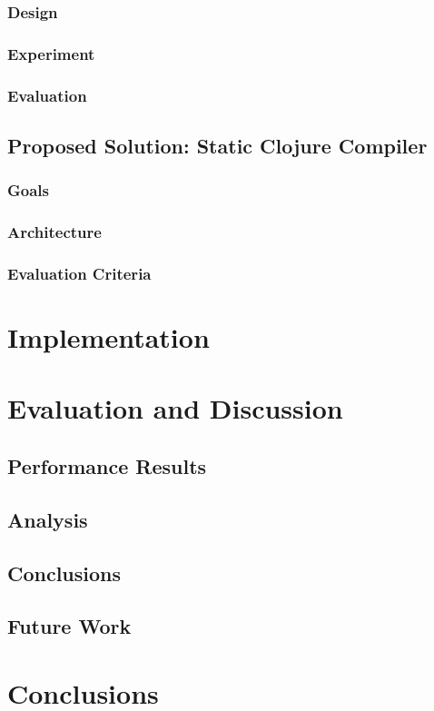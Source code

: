 \subsection{Design}
\subsection{Experiment}
\subsection{Evaluation}

\section{Proposed Solution: Static Clojure Compiler}
\subsection{Goals}
\subsection{Architecture}
\subsection{Evaluation Criteria}



\chapter{Implementation}
\label{chapter:implementation}



\chapter{Evaluation and Discussion}
\label{chapter:evaluation}


\section{Performance Results}
\section{Analysis}
\section{Conclusions}
\section{Future Work}


\chapter{Conclusions}
\label{chapter:conclusions}

